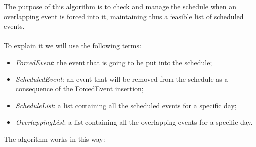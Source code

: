 The purpose of this algorithm is to check and manage the schedule when an overlapping event is forced into it, maintaining thus a feasible list of scheduled events. \\ \\
To explain it we will use the following terms: 
\begin{itemize}
	\item \textit{ForcedEvent}: the event that is going to be put into the schedule;
	\item \textit{ScheduledEvent}: an event that will be removed from the schedule as a consequence of the ForcedEvent insertion;
	\item \textit{ScheduleList}: a list containing all the scheduled events for a specific day;
	\item \textit{OverlappingList}: a list containing all the overlapping events for a specific day.
\end{itemize}
\newpage
\noindent The algorithm works in this way:
